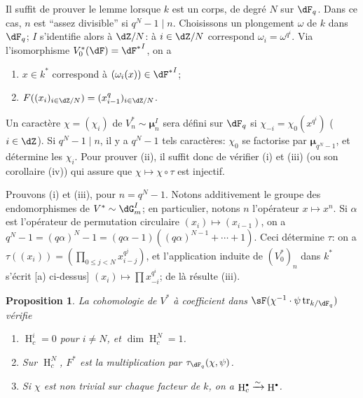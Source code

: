 \documentclass[oneside]{book}
\DeclareMathOperator{\h}{H}
\DeclareMathOperator{\tr}{tr}
\newcommand{\dmu}{{\bm\mu}}
\newcommand{\iso}{\xrightarrow\sim}
\theoremstyle{sga-source}
\theoremstyle{sga-source-dash}
\theoremstyle{sga-source-dotdash}
\theoremstyle{sga-source-number-note-dash}
\theoremstyle{sga-source-note-number-dotdash}
\theoremstyle{sga-source-example-dotdash}
\theoremstyle{sga-source-inline-number}
\theoremstyle{sga-source-bare-number}
\theoremstyle{sga-source}
\newtheorem{proposition_}[subsection]{Proposition}
\let\oldbullet\bullet
\renewcommand{\bullet}{\textnormal{\tiny$\oldbullet$}}
\newcommand{\PrintPage}[1]{}\newcommand{\MathPage}[1]{}\newcommand{\PrintCite}[2]{#1}\newcommand{\var}[3]{#1}
\begin{document}
Il suffit de prouver le lemme lorsque $k$ est un corps, de degré $N$ sur 
$\dF_q$. Dans ce cas, $n$ est ``assez divisible'' si $q^N-1\mid n$. 
Choisissons \var{un plongement $\omega$ de $k$ dans $\dF_q$}{un plongement $\omega$ de $k$ dans $\dF$}{S45-SOL-0820}; $I$ s'identifie alors 
à $\dZ/N$: à $i\in \dZ/N$ correspond $\omega_i=\omega^{q^i}$. Via 
l'isomorphisme $V_0^\ast(\dF) = {\dF^\ast}^I$, on a 
\begin{enumerate}[\indent a)]
  \item $x\in k^\ast$ correspond à $(\omega_i(x))\in {\dF^\ast}^I$; 
  \item $F((x_i)_{i\in \dZ/N})=(x_{i-1}^q)_{i\in \dZ/N}$. 
\end{enumerate}

\PrintPage{201}
Un caractère $\chi=(\chi_i)$ de $V_n^\ast\sim \dmu_n^I$ sera défini sur 
$\dF_q$ si $\chi_{-i} =\chi_0(x^{q^i})$ ($i\in \dZ$). Si $q^N-1\mid n$, il y a 
$q^N-1$ tels caractères: $\chi_0$ se factorise par $\dmu_{q^N-1}$, et 
détermine les $\chi_i$. Pour prouver (ii), il suffit donc de vérifier (i) 
et (iii) (ou son corollaire (iv)) qui assure que $\chi\mapsto \chi\circ \tau$ 
est injectif. 

Prouvons (i) et (iii), pour $n=q^N-1$. Notons additivement le groupe des 
endomorphismes de $V^\ast\sim \dG_m^I$; en particulier, notons $n$ 
l'opérateur $x\mapsto x^n$. Si $\alpha$ est l'opérateur de permutation 
circulaire $(x_i)\mapsto (x_{i-1})$, on a 
$q^N-1=(q\alpha)^N-1 = (q\alpha-1)((q\alpha)^{N-1}+\cdots + 1)$. Ceci 
détermine $\tau$: on a $\tau((x_i)) = (\prod_{0\leqslant j<N} x_{i-j}^{q^j})$, 
et l'application induite de $(V_0^\ast)_n$ dans $k^\ast$ s'écrit [a) 
ci-dessus] $(x_i)\mapsto \prod x_{-i}^{q^i}$; de là résulte (iii). 





\begin{proposition_}\label{VI:4-10}
La cohomologie de $V^\ast$ à coefficient dans 
$\sF(\chi^{-1}\cdot \psi\tr_{k/\dF_q})$ vérifie 
\begin{enumerate}[\indent (i)]
  \item $\h_c^i = 0$ pour $i\ne N$, et $\dim \h_c^N=1$. 
  \item Sur $\h_c^N$, $F^\ast$ est la multiplication par 
    $\tau_{\dF_q}(\chi,\psi)$. 
  \item Si $\chi$ est non trivial sur chaque facteur de $k$, on a 
    $\h_c^\bullet \iso \h^\bullet$. 
\end{enumerate}
\end{proposition_}
\end{document}
